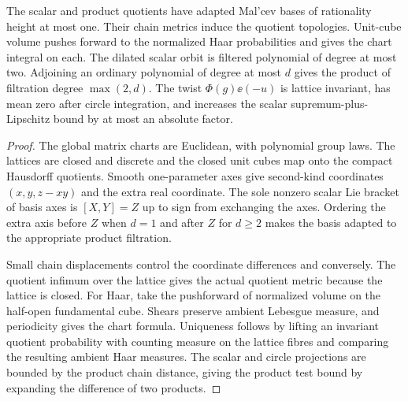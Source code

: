 \begin{lemma}\label{checked-group-model}
\leanok
The scalar and product quotients have adapted Mal'cev bases of
rationality height at most one. Their chain metrics induce the
quotient topologies. Unit-cube volume pushes forward to the normalized
Haar probabilities and gives the chart integral on each. The
dilated scalar orbit is filtered polynomial of degree at most two.
Adjoining an ordinary polynomial of degree at most $d$ gives the
product of filtration degree $\max(2,d)$. The twist
$\Phi(g)\ee(-u)$ is lattice invariant, has mean zero after circle
integration, and increases the scalar supremum-plus-Lipschitz
bound by at most an absolute factor.
\end{lemma}
\begin{proof}
\leanok
The global matrix charts are Euclidean, with polynomial group laws.
The lattices are closed and discrete and the closed unit cubes
map onto the compact Hausdorff quotients. Smooth one-parameter axes
give second-kind coordinates $(x,y,z-xy)$ and the extra real coordinate.
The sole nonzero scalar Lie bracket of basis axes is
$[X,Y]=Z$ up to sign from exchanging the axes. Ordering the extra axis
before $Z$ when $d=1$ and after $Z$ for $d\ge2$ makes the basis
adapted to the appropriate product filtration.

Small chain displacements control the coordinate differences and
conversely. The quotient infimum over the lattice gives the actual
quotient metric because the lattice is closed. For Haar, take the
pushforward of normalized volume on the half-open fundamental cube.
Shears preserve ambient Lebesgue measure, and periodicity gives the
chart formula. Uniqueness follows by lifting an invariant quotient
probability with counting measure on the lattice fibres and comparing
the resulting ambient Haar measures. The scalar and circle
projections are bounded by the product chain distance, giving the
product test bound by expanding the difference of two products.
\end{proof}

